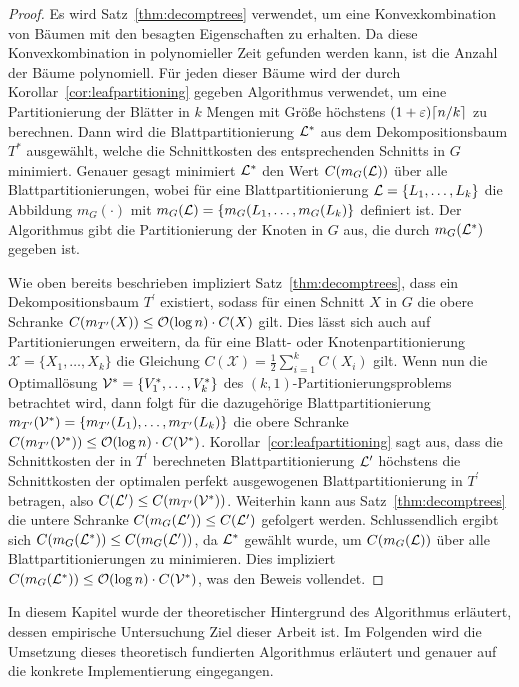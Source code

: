 \begin{proof}
    Es wird Satz~\ref{thm:decomptrees} verwendet, um eine Konvexkombination von Bäumen mit den besagten Eigenschaften zu erhalten.
    Da diese Konvexkombination in polynomieller Zeit gefunden werden kann, ist die Anzahl der Bäume polynomiell.
    Für jeden dieser Bäume wird der durch Korollar~\ref{cor:leafpartitioning} gegeben Algorithmus verwendet, um eine Partitionierung der Blätter in $k$ Mengen mit Größe höchstens $(1 + \eps) \ceil*{n/k}$ zu berechnen. Dann wird die Blattpartitionierung $\mathcal{L}^*$ aus dem Dekompositionsbaum $T^*$ ausgewählt, welche die Schnittkosten des entsprechenden Schnitts in $G$ minimiert.
    Genauer gesagt minimiert $\mathcal{L}^*$ den Wert $C(m_G(\mathcal{L}))$ über alle Blattpartitionierungen, wobei für eine Blattpartitionierung $\mathcal{L} = \{L_1, \ldots, L_k\}$ die Abbildung $m_G(\cdot)$ mit $m_G(\mathcal{L}) = \{m_G(L_1, \ldots, m_G(L_k)\}$ definiert ist.
    Der Algorithmus gibt die Partitionierung der Knoten in $G$ aus, die durch $m_G(\mathcal{L}^*)$ gegeben ist.

    Wie oben bereits beschrieben impliziert Satz~\ref{thm:decomptrees}, dass ein Dekompositionsbaum $T^\prime$ existiert, sodass für einen Schnitt $X$ in $G$ die obere Schranke $C(m_{T^\prime}(X)) \leq \mathcal{O}(\log n) \cdot C(X)$ gilt.
    Dies lässt sich auch auf Partitionierungen erweitern, da für eine Blatt- oder Knotenpartitionierung $\mathcal{X} = \{X_1, \ldots, X_k\}$ die Gleichung $C(\mathcal{X}) = \frac{1}{2} \sum_{i=1}^k C(X_i)$ gilt.
    Wenn nun die Optimallösung $\mathcal{V}^* = \{ V_1^*, \ldots, V_k^* \}$ des $(k, 1)$\hyp Partitionierungsproblems betrachtet wird, dann folgt für die dazugehörige Blattpartitionierung $m_{T^\prime}(\mathcal{V}^*) = \{ m_{T^\prime}(L_1), \ldots, m_{T^\prime}(L_k) \}$ die obere Schranke $C(m_{T^\prime}(\mathcal{V}^*)) \leq \mathcal{O}(\log n) \cdot C(\mathcal{V}^*)$.
    Korollar~\ref{cor:leafpartitioning} sagt aus, dass die Schnittkosten der in $T^\prime$ berechneten Blattpartitionierung $\mathcal{L}^\prime$ höchstens die Schnittkosten der optimalen perfekt ausgewogenen Blattpartitionierung in $T^\prime$ betragen, also $C(\mathcal{L}^\prime) \leq C(m_{T^\prime}(\mathcal{V}^*))$.
    Weiterhin kann aus Satz~\ref{thm:decomptrees} die untere Schranke $C(m_G(\mathcal{L}^\prime)) \leq C(\mathcal{L}^\prime)$ gefolgert werden.
    Schlussendlich ergibt sich $C(m_G(\mathcal{L}^*)) \leq C(m_G(\mathcal{L}^\prime))$, da $\mathcal{L}^*$ gewählt wurde, um $C(m_G(\mathcal{L}))$ über alle Blattpartitionierungen zu minimieren.
    Dies impliziert $C(m_G(\mathcal{L}^*)) \leq \mathcal{O}(\log n) \cdot C(\mathcal{V}^*)$, was den Beweis vollendet.
\end{proof}

In diesem Kapitel wurde der theoretischer Hintergrund des Algorithmus erläutert, dessen empirische Untersuchung Ziel dieser Arbeit ist.  
Im Folgenden wird die Umsetzung dieses theoretisch fundierten Algorithmus erläutert und genauer auf die konkrete Implementierung eingegangen.

